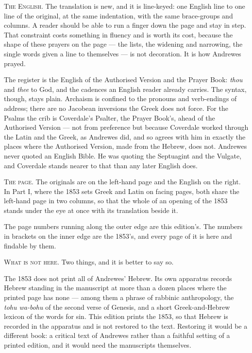 \vspace{0.8\baselineskip}
{\scshape The English.}\quad
The translation is new, and it is line-keyed: one English line to one line of the
original, at the same indentation, with the same brace-groups and columns. A
reader should be able to run a finger down the page and stay in step. That
constraint costs something in fluency and is worth its cost, because the shape of
these prayers on the page --- the lists, the widening and narrowing, the single
words given a line to themselves --- is not decoration. It is how Andrewes prayed.

The register is the English of the Authorised Version and the Prayer Book:
\emph{thou} and \emph{thee} to God, and the cadences an English reader already
carries. The syntax, though, stays plain. Archaism is confined to the pronouns and
verb-endings of address; there are no Jacobean inversions the Greek does not
force. For the Psalms the crib is Coverdale's Psalter, the Prayer Book's, ahead of
the Authorised Version --- not from preference but because Coverdale worked
through the Latin and the Greek, as Andrewes did, and so agrees with him in
exactly the places where the Authorised Version, made from the Hebrew, does not.
Andrewes never quoted an English Bible. He was quoting the Septuagint and the
Vulgate, and Coverdale stands nearer to that than any later English does.

\vspace{0.8\baselineskip}
{\scshape The page.}\quad
The originals are on the left-hand page and the English on the right. In Part I,
where the 1853 sets Greek and Latin on facing pages, both share the left-hand page
in two columns, so that the whole of an opening of the 1853 stands under the eye
at once with its translation beside it.

The page numbers running along the outer edge are this edition's. The numbers in
brackets on the inner edge are the 1853's, and every page of it is here and
findable by them.

\vspace{0.8\baselineskip}
{\scshape What is not here.}\quad
Two things, and it is better to say so.

The 1853 does not print all of Andrewes' Hebrew. Its own apparatus records Hebrew
standing in the manuscript at more than a dozen places where the printed page has
none --- among them a phrase of rabbinic anthropology, the \emph{tohu wa-bohu} of
the second verse of Genesis, and a short Greek-and-Hebrew lexicon of the words for
sin. This edition prints the 1853, so that Hebrew is recorded in the apparatus
and is not restored to the text. Restoring it would be a different book: a
critical text of Andrewes rather than a faithful setting of a printed edition, and
it would need the manuscripts themselves.

